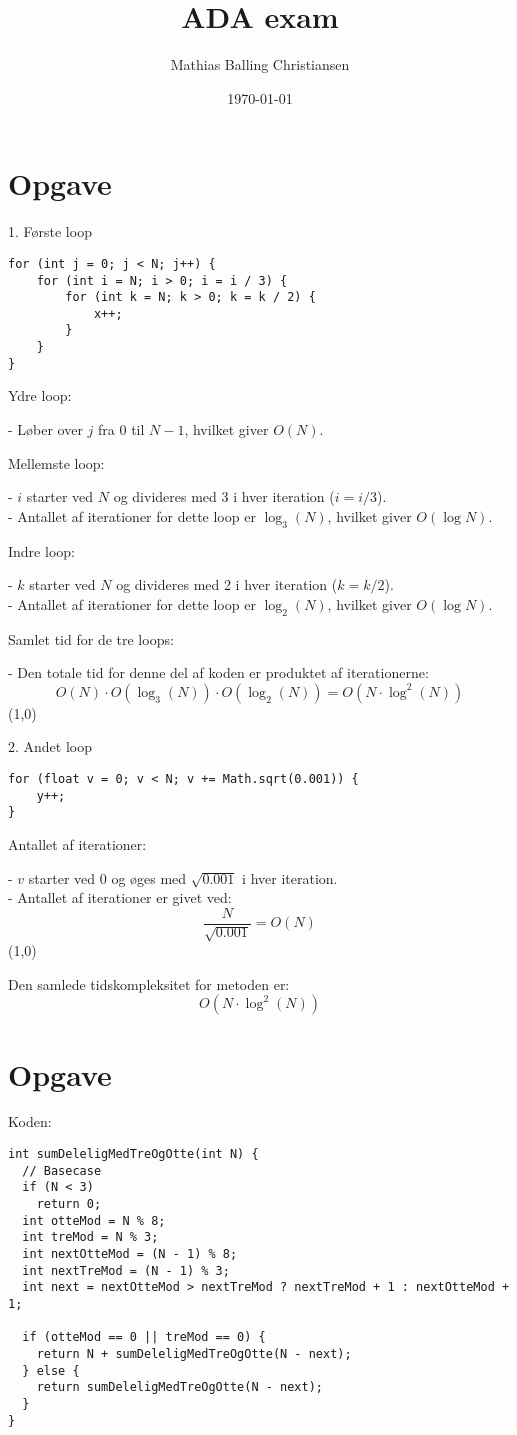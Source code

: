 \documentclass{article}
\title{ADA exam}
\author{Mathias Balling Christiansen}
\date{\today}
\begin{document}
\maketitle
\tableofcontents
\newpage

\section{Opgave} %
1. Første loop
\begin{verbatim}
for (int j = 0; j < N; j++) {
    for (int i = N; i > 0; i = i / 3) {
        for (int k = N; k > 0; k = k / 2) {
            x++;
        }
    }
}
\end{verbatim}

Ydre loop:

- Løber over \( j \) fra \( 0 \) til \( N - 1 \), hvilket giver \( O(N) \).

Mellemste loop:

- \( i \) starter ved \( N \) og divideres med 3 i hver iteration (\( i = i / 3 \)).\\
- Antallet af iterationer for dette loop er \( \log_3(N) \), hvilket giver \( O(\log N) \).

Indre loop:

- \( k \) starter ved \( N \) og divideres med 2 i hver iteration (\( k = k / 2 \)).\\
- Antallet af iterationer for dette loop er \( \log_2(N) \), hvilket giver \( O(\log N) \).

Samlet tid for de tre loops:

- Den totale tid for denne del af koden er produktet af iterationerne:
  \[
  O(N) \cdot O(\log_3(N)) \cdot O(\log_2(N)) = O(N \cdot \log^2(N))
  \]
\line(1,0){\textwidth}

2. Andet loop
\begin{verbatim}
for (float v = 0; v < N; v += Math.sqrt(0.001)) {
    y++;
}
\end{verbatim}

Antallet af iterationer:

  - \( v \) starter ved \( 0 \) og øges med \( \sqrt{0.001} \) i hver iteration.\\
  - Antallet af iterationer er givet ved:
  \[
  \frac{N}{\sqrt{0.001}} = O(N)
  \]
\line(1,0){\textwidth}

Den samlede tidskompleksitet for metoden er:
\[
O(N \cdot \log^2(N))
\]
\section{Opgave} %
Koden:
\begin{verbatim}
int sumDeleligMedTreOgOtte(int N) {
  // Basecase
  if (N < 3)
    return 0;
  int otteMod = N % 8;
  int treMod = N % 3;
  int nextOtteMod = (N - 1) % 8;
  int nextTreMod = (N - 1) % 3;
  int next = nextOtteMod > nextTreMod ? nextTreMod + 1 : nextOtteMod + 1;

  if (otteMod == 0 || treMod == 0) {
    return N + sumDeleligMedTreOgOtte(N - next);
  } else {
    return sumDeleligMedTreOgOtte(N - next);
  }
}
\end{verbatim}
\end{document}
